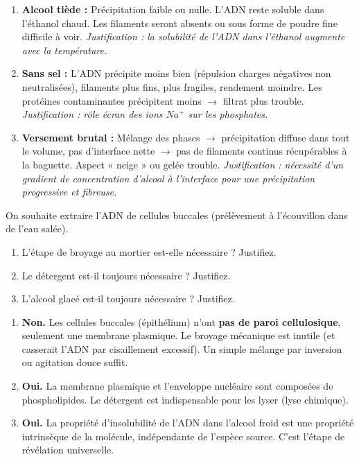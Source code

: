 \documentclass[11pt]{article}
\begin{document}
\begin{corrige}
\begin{enumerate}
    \item \textbf{Alcool tiède :} Précipitation faible ou nulle. L'ADN reste soluble dans l'éthanol chaud. Les filaments seront absents ou sous forme de poudre fine difficile à voir. \textit{Justification : la solubilité de l'ADN dans l'éthanol augmente avec la température.}
    \item \textbf{Sans sel :} L'ADN précipite moins bien (répulsion charges négatives non neutralisées), filaments plus fins, plus fragiles, rendement moindre. Les protéines contaminantes précipitent moins $\rightarrow$ filtrat plus trouble. \textit{Justification : rôle écran des ions $Na^+$ sur les phosphates.}
    \item \textbf{Versement brutal :} Mélange des phases $\rightarrow$ précipitation diffuse dans tout le volume, pas d'interface nette $\rightarrow$ pas de filaments continus récupérables à la baguette. Aspect « neige » ou gelée trouble. \textit{Justification : nécessité d'un gradient de concentration d'alcool à l'interface pour une précipitation progressive et fibreuse.}
\end{enumerate}
\end{corrige}

\begin{exercice}
On souhaite extraire l'ADN de cellules buccales (prélèvement à l'écouvillon dans de l'eau salée).
\begin{enumerate}
    \item L'étape de broyage au mortier est-elle nécessaire ? Justifiez.
    \item Le détergent est-il toujours nécessaire ? Justifiez.
    \item L'alcool glacé est-il toujours nécessaire ? Justifiez.
\end{enumerate}
\end{exercice}

\begin{corrige}
\begin{enumerate}
    \item \textbf{Non.} Les cellules buccales (épithélium) n'ont \textbf{pas de paroi cellulosique}, seulement une membrane plasmique. Le broyage mécanique est inutile (et casserait l'ADN par cisaillement excessif). Un simple mélange par inversion ou agitation douce suffit.
    \item \textbf{Oui.} La membrane plasmique et l'enveloppe nucléaire sont composées de phospholipides. Le détergent est indispensable pour les lyser (lyse chimique).
    \item \textbf{Oui.} La propriété d'insolubilité de l'ADN dans l'alcool froid est une propriété intrinsèque de la molécule, indépendante de l'espèce source. C'est l'étape de révélation universelle.
\end{enumerate}
\end{corrige}
\end{document}
